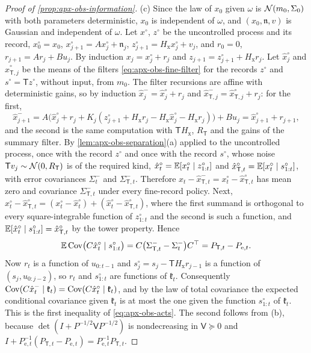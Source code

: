\begin{proof}[Proof of \cref{prop:apx-obs-information}]
(c) Since the law of $x_0$ given $\omega$ is $\mathcal{N}(m_0,\Sigma_0)$ with both parameters deterministic, $x_0$ is independent of $\omega$, and $(x_0,\mathfrak n,v)$ is Gaussian and independent of $\omega$. Let $x^\circ$, $z^\circ$ be the uncontrolled process and its record, $x^\circ_0=x_0$, $x^\circ_{j+1}=Ax^\circ_j+\mathfrak n_j$, $z^\circ_{j+1}=H_{\mathrm x}x^\circ_j+v_j$, and $r_0=0$, $r_{j+1}=Ar_j+Bu_j$. By induction $x_j=x^\circ_j+r_j$ and $z_{j+1}=z^\circ_{j+1}+H_{\mathrm x}r_j$. Let $\hat x^\circ_j$ and $\hat x^\circ_{\mathsf T,j}$ be the means of the filters \eqref{eq:apx-obs-fine-filter} for the records $z^\circ$ and $s^\circ=\mathsf Tz^\circ$, without input, from $m_0$. The filter recursions are affine with deterministic gains, so by induction $\hat x^-_j=\hat x^\circ_j+r_j$ and $\hat x^-_{\mathsf T,j}=\hat x^\circ_{\mathsf T,j}+r_j$: for the first,
\begin{equation*}
\hat x^-_{j+1}=A\bigl(\hat x^\circ_j+r_j+K_j(z^\circ_{j+1}+H_{\mathrm x}r_j-H_{\mathrm x}\hat x^\circ_j-H_{\mathrm x}r_j)\bigr)+Bu_j=\hat x^\circ_{j+1}+r_{j+1},
\end{equation*}
and the second is the same computation with $\mathsf TH_{\mathrm x}$, $R_{\mathsf T}$ and the gains of the summary filter. By \cref{lem:apx-obs-separation}(a) applied to the uncontrolled process, once with the record $z^\circ$ and once with the record $s^\circ$, whose noise $\mathsf Tv_j\sim\mathcal{N}(0,R_{\mathsf T})$ is of the required kind, $\hat x^\circ_t=\mathbb{E}[x^\circ_t\mid z^\circ_{1:t}]$ and $\hat x^\circ_{\mathsf T,t}=\mathbb{E}[x^\circ_t\mid s^\circ_{1:t}]$, with error covariances $\Sigma^-_t$ and $\Sigma^-_{\mathsf T,t}$. Therefore $x_t-\hat x^-_{\mathsf T,t}=x^\circ_t-\hat x^\circ_{\mathsf T,t}$ has mean zero and covariance $\Sigma^-_{\mathsf T,t}$ under every fine-record policy. Next, $x^\circ_t-\hat x^\circ_{\mathsf T,t}=(x^\circ_t-\hat x^\circ_t)+(\hat x^\circ_t-\hat x^\circ_{\mathsf T,t})$, where the first summand is orthogonal to every square-integrable function of $z^\circ_{1:t}$ and the second is such a function, and $\mathbb{E}[\hat x^\circ_t\mid s^\circ_{1:t}]=\hat x^\circ_{\mathsf T,t}$ by the tower property. Hence
\begin{equation*}
\mathbb{E}\operatorname{Cov}\bigl(C\hat x^\circ_t\mid s^\circ_{1:t}\bigr)=C\bigl(\Sigma^-_{\mathsf T,t}-\Sigma^-_t\bigr)C^\top=P_{\mathsf T,t}-P_{\mathrm e,t} .
\end{equation*}
Now $r_t$ is a function of $u_{0:t-1}$ and $s^\circ_j=s_j-\mathsf TH_{\mathrm x}r_{j-1}$ is a function of $(s_j,u_{0:j-2})$, so $r_t$ and $s^\circ_{1:t}$ are functions of $\mathfrak k_t$. Consequently $\operatorname{Cov}(C\hat x^-_t\mid\mathfrak k_t)=\operatorname{Cov}(C\hat x^\circ_t\mid\mathfrak k_t)$, and by the law of total covariance the expected conditional covariance given $\mathfrak k_t$ is at most the one given the function $s^\circ_{1:t}$ of $\mathfrak k_t$. This is the first inequality of \eqref{eq:apx-obs-acts}. The second follows from (b), because $\det(I+P^{-1/2}\mathsf VP^{-1/2})$ is nondecreasing in $\mathsf V\succeq0$ and $I+P_{\mathrm e,t}^{-1}(P_{\mathsf T,t}-P_{\mathrm e,t})=P_{\mathrm e,t}^{-1}P_{\mathsf T,t}$.


\end{proof}
